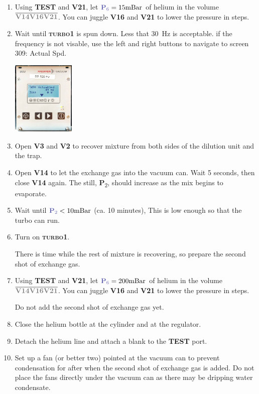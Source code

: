 \documentclass{article}[18pt,A4]
\newcommand{\mBar}{\mathrm{mBar}}
\newcommand{\thing}[1]{{\color{gray}\textsc{ \textbf{#1}}}}
\newcommand{\valve}[1]{{\color{gray}\textbf{V#1}}}
\newcommand{\pressure}[1]{{\color{pressurecolor}\textbf{P}\textsubscript{#1}}}
\newcommand{\volume}[1]{\ensuremath{\overline{#1}}}
\begin{document}
\begin{enumerate}
    \item Using \thing{TEST} and \valve{21}, let $\pressure{6} = 15 \mBar$ of helium in the
    volume \volume{\valve{14} \valve{16} \valve{21}}. You can juggle \valve{16} and \valve{21} to lower the pressure in steps. 
    \item Wait until \thing{turbo1} is spun down. Less that $30$~Hz is acceptable.
    if the frequency is not visable, use the left and right buttons to navigate to screen 309: Actual Spd.
    
    {
\centering
\includegraphics[width=3cm]{fig/turbo_speed.jpg}
}
    
    \item Open \valve{3} and \valve{2} to recover mixture from both sides of the dilution unit and the trap.
    \item Open \valve{14} to let the exchange gas into the vacuum can. Wait 5 seconds, then close \valve{14} again.
    The still, \pressure{2}, should increase as the mix begins to evaporate.
    \item Wait until $\pressure{2} < 10 \mBar$ (ca. 10 minutes), This is low enough so that the turbo can run.
    \item Turn on \thing{turbo1}.
    
    There is time while the rest of mixture is recovering, so prepare the second shot of exchange gas.
    
    \item Using \thing{TEST} and \valve{21}, let $\pressure{6} = 200 \mBar$ of helium in the
    volume \volume{\valve{14} \valve{16} \valve{21}}. You can juggle \valve{16} and \valve{21} to lower the pressure in steps. 
    
    Do not add the second shot of exchange gas yet.
    
    \item Close the helium bottle at the cylinder and at the regulator.
    \item Detach the helium line and attach a blank to the \thing{TEST} port.
    \item Set up a fan (or better two) pointed at the vacuum can to prevent condensation for after when the second shot of exchange gas is added.
    Do not place the fans directly under the vacuum can as there may be dripping water condensate.
    

\end{enumerate}
\end{document}
